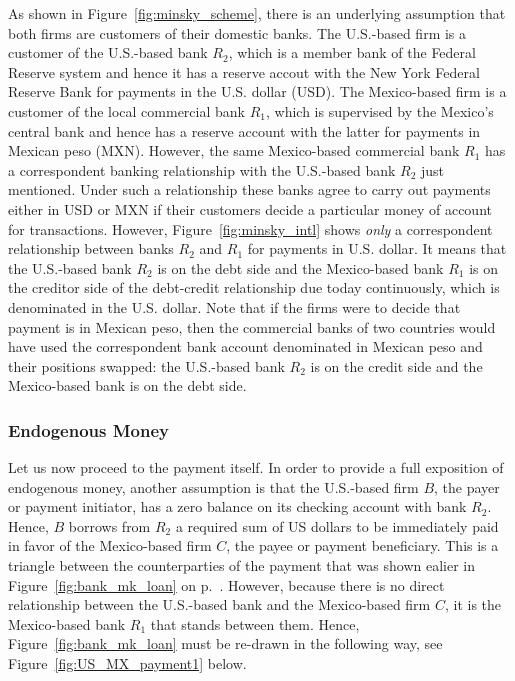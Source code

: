 As shown in Figure~\ref{fig:minsky_scheme}, there is an underlying assumption that both firms are customers of their domestic banks. The U.S.-based firm is a customer of the U.S.-based bank $R_2$, which is a member bank of the Federal Reserve system and hence it has a reserve accout with the New York Federal Reserve Bank for payments in the U.S. dollar (USD). The Mexico-based firm is a customer of the local commercial bank $R_1$, which is supervised by the Mexico's central bank and hence has a reserve account with the latter for payments in Mexican peso (MXN). However, the same Mexico-based commercial bank $R_1$ has a correspondent banking relationship with the U.S.-based bank $R_2$ just mentioned. Under such a relationship these banks agree to carry out payments either in USD or MXN if their customers decide a particular money of account for transactions. However, Figure~\ref{fig:minsky_intl} shows \textit{only} a correspondent relationship between banks $R_2$ and $R_1$ for payments in U.S. dollar. It means that the U.S.-based bank $R_2$ is on the debt side and the Mexico-based bank $R_1$ is on the creditor side of the debt-credit relationship due today continuously, which is denominated in the U.S. dollar. Note that if the firms were to decide that payment is in Mexican peso, then the commercial banks of two countries would have used the correspondent bank account denominated in Mexican peso and their positions swapped: the U.S.-based bank $R_2$ is on the credit side and the Mexico-based bank is on the debt side.

\subsubsection{Endogenous Money}

Let us now proceed to the payment itself. In order to provide a full exposition of endogenous money, another assumption is that the U.S.-based firm $B$, the payer or payment initiator, has a zero balance on its checking account with bank $R_2$. Hence, $B$ borrows from $R_2$ a required sum of US dollars to be immediately paid in favor of the Mexico-based firm $C$, the payee or payment beneficiary. This is a triangle between the counterparties of the payment that was shown ealier in Figure~\ref{fig:bank_mk_loan} on p.~\pageref{fig:bank_mk_loan}. However, because there is no direct relationship between the U.S.-based bank and the Mexico-based firm $C$, it is the Mexico-based bank $R_1$ that stands between them. Hence, Figure~\ref{fig:bank_mk_loan} must be re-drawn in the following way, see Figure~\ref{fig:US_MX_payment1} below. 

